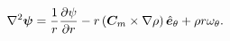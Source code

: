 \begin{equation}
    \label{eqn:poissonpsi}
        \nabla^2\bm{\psi} = \frac{1}{r} \frac{\partial \psi}{\partial r} - r \left(\bm{C}_m \times \nabla\rho\right) \hat{\bm{e}}_\theta + \rho r \omega_\theta.
\end{equation}

%
%
%
%
%
